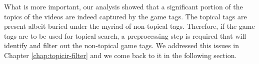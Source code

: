 What is more important, our analysis showed that a significant portion of the topics of the videos are indeed captured by the game tags. The topical tags are present albeit buried under the myriad of non-topical tags. Therefore, if the game tags are to be used for topical search, a preprocessing step is required that will identify and filter out the non-topical game tags. We addressed this issues in Chapter \ref{chap:topicir-filter} and we come back to it in the following section.


